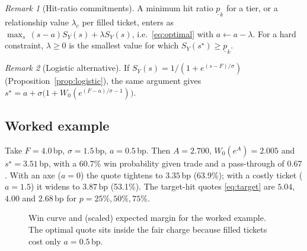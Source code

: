 \documentclass[11pt,a4paper]{article}
\theoremstyle{definition}
\theoremstyle{remark}
\newtheorem{remark}{Remark}
\newcommand{\Wo}{W_0}
\begin{document}
\begin{remark}[Hit-ratio commitments]
A minimum hit ratio $\underline p_k$ for a tier, or a relationship value $\lambda_c$ per filled ticket, enters as $\max_s\,(s-a)S_Y(s)+\lambda S_Y(s)$, i.e.\ \eqref{eq:optimal} with $a\leftarrow a-\lambda$. For a hard constraint, $\lambda\ge0$ is the smallest value for which $S_Y(s^\star)\ge\underline p_k$.
\end{remark}

\begin{remark}[Logistic alternative]\label{rem:logistic}
If $S_Y(s)=1/(1+e^{(s-F)/\sigma})$ (Proposition~\ref{prop:logistic}), the same argument gives $s^\star=a+\sigma\bigl(1+\Wo(e^{(F-a)/\sigma-1})\bigr)$.
\end{remark}

\subsection{Worked example}
Take $F=4.0$\,bp, $\sigma=1.5$\,bp, $a=0.5$\,bp. Then $A=2.700$, $\Wo(e^A)=2.005$ and $s^\star=3.51$\,bp, with a 60.7\% win probability given trade and a pass-through of $0.67$. With an axe ($a=0$) the quote tightens to $3.35$\,bp (63.9\%); with a costly ticket ($a=1.5$) it widens to $3.87$\,bp (53.1\%). The target-hit quotes \eqref{eq:target} are $5.04$, $4.00$ and $2.68$\,bp for $p=25\%,50\%,75\%$.

\begin{figure}[h]
\centering
{}
\caption{Win curve and (scaled) expected margin for the worked example. The optimal quote sits inside the fair charge because filled tickets cost only $a=0.5$\,bp.}
\end{figure}
\end{document}
